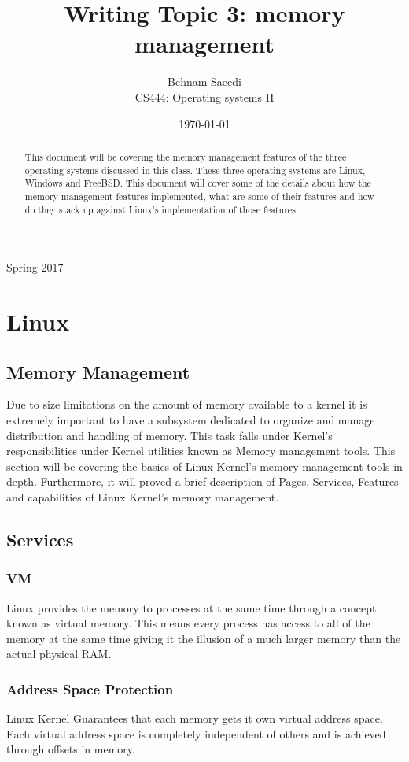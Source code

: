 \documentclass[journal,10pt,onecolumn,compsoc,letterpaper,draftclsnofoot,table,xcdraw]{IEEEtran} \usepackage[margin=0.75in]{geometry}
\title{Writing Topic 3: memory management}
\author{Behnam Saeedi\\ CS444: Operating systems II}
\date{\today}
\begin{document}
\maketitle
\begin{centering}
Spring 2017
\begin{abstract}
\noindent This document will be covering the memory management features of the three operating systems discussed in this class. These three operating systems are Linux, Windows and FreeBSD. This document will cover some of the details about how the memory management features implemented, what are some of their features and how do they stack up against Linux's implementation of those features.
\end{abstract}
\end{centering}
\newpage
\tableofcontents
\newpage
\section{Linux}
\subsection{Memory Management}
\noindent Due to size limitations on the amount of memory available to a kernel it is extremely important to have a subsystem dedicated to organize and manage distribution and handling of memory. This task falls under Kernel's responsibilities under Kernel utilities known as Memory management tools. This section will be covering the basics of Linux Kernel's memory management tools in depth. Furthermore, it will proved a brief description of Pages, Services, Features and capabilities of Linux Kernel's memory management.
\subsection{Services}
\subsubsection{VM}
\noindent Linux provides the memory to processes at the same time through a concept known as virtual memory. This means every process has access to all of the memory at the same time giving it the illusion of a much larger memory than the actual physical RAM.\cite{1}
\subsubsection{Address Space Protection}
\indent Linux Kernel Guarantees that each memory gets it own virtual address space. Each virtual address space is completely independent of others and is achieved through offsets in memory.\cite{1}
\end{document}
